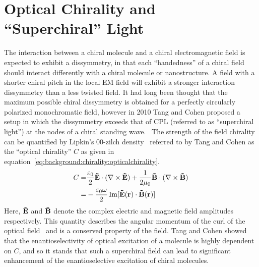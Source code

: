 \section{Optical Chirality and ``Superchiral'' Light}\label{sec:background:Chirality:opticalchirality}
The interaction between a chiral molecule and a chiral electromagnetic field is expected to exhibit a dissymmetry, in that each ``handedness'' of a chiral field should interact differently with a chiral molecule or nanostructure. A field with a shorter chiral pitch in the local EM field will exhibit a stronger interaction dissymmetry than a less twisted field. It had long been thought that the maximum possible chiral dissymmetry is obtained for a perfectly circularly polarized monochromatic field, however in 2010 Tang and Cohen proposed a setup in which the dissymmetry exceeds that of CPL (referred to as ``superchiral light'') at the nodes of a chiral standing wave.~\cite{Tang2010}
The strength of the field chirality can be quantified by Lipkin's 00-zilch density~\cite{Lipkin1964} referred to by Tang and Cohen as the ``optical chirality'' $C$ as given in equation~\ref{eq:background:chirality:opticalchirality}.
\begin{equation} \label{eq:background:chirality:opticalchirality}
    \begin{split}
        C = &\frac{\varepsilon_0 }{2}{\bf{\tilde E}} \cdot (\nabla  \times {\bf{\tilde E}}) + \frac{1}{{2\mu _0}}{\bf{\tilde B}} \cdot (\nabla  \times {\bf{\tilde B}}) \\
        = &- \frac{{{\varepsilon _0}\omega }}{2} \operatorname{Im}[ \bf{\tilde E}(\bf{r}) \cdot \bf{\tilde B}(\bf{r}) ]
    \end{split}
\end{equation}
Here, $\bf{\tilde E}$ and $\bf{\tilde B}$ denote the complex electric and magnetic field amplitudes respectively. This quantity describes the angular momentum of the curl of the optical field~\cite{Cameron2012a} and is a conserved property of the field. Tang and Cohen showed that the enantioselectivity of optical excitation of a molecule is highly dependent on $C$, and so it stands that such a superchiral field can lead to significant enhancement of the enantioselective excitation of chiral molecules.

